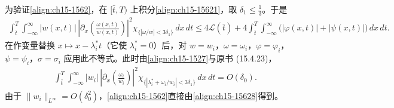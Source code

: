 \documentclass[../../main.tex]{subfiles}
\begin{document}
为验证\eqref{align:ch15-1562}，在 $[\bar t,T)$ 上积分\eqref{align:ch15-15621}，取 $\delta_1\leqslant\frac13$。于是
\begin{align}
\int_{\bar t}^{T}\int_{-\infty}^{\infty}|w(x,t)|\,\left|\partial_x\left(\frac{\omega(x,t)}{w(x,t)}\right)\right|^2\chi_{\{|\omega/w|<3\delta_1\}}\,dx\,dt\leqslant4\mathscr{L}(\bar t)+4\int_{\bar t}^{T}\int_{-\infty}^{\infty}\bigl(|\varphi(x,t)|+|\psi(x,t)|\bigr)\,dx\,dt.
\label{align:ch15-15627}
\end{align}
在作变量替换 $x\mapsto x-\lambda_i^*t$（它使 $\lambda_i^*=0$）后，对 $w=w_i$，$\omega=\omega_i$，$\varphi=\varphi_i$，$\psi=\psi_i$，$\sigma=\sigma_i$ 应用此不等式。此时由\eqref{align:ch15-1527}与原书 (15.4.23)，
\begin{align}
\int_{\bar t}^{T}\int_{-\infty}^{\infty}|w_i|\,\left|\partial_x\left(\frac{\omega_i}{w_i}\right)\right|^2\chi_{\{|\lambda_i^*+\omega_i/w_i|<3\delta_1\}}\,dx\,dt=O(\delta_0).
\label{align:ch15-15628}
\end{align}
由于 $\|w_i\|_{L^\infty}=O(\delta_0^2)$，\eqref{align:ch15-1562}直接由\eqref{align:ch15-15628}得到。
\end{document}
